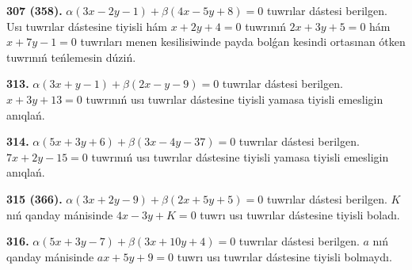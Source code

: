 \documentclass{article}
\begin{document}
\textbf{307 (358).} \(\alpha(3x-2y-1)+\beta(4x-5y+8)=0\) tuwrılar
dástesi berilgen. Usı tuwrılar dástesine tiyisli hám \(x+2y+4=0\)
tuwrınıń \(2x+3y+5=0\) hám \(x+7y-1=0\) tuwrıları menen
kesilisiwinde payda bolǵan kesindi ortasınan ótken tuwrınıń teńlemesin
dúziń.

\textbf{313.}
\(\alpha(3x+y-1)+\beta(2x-y-9)=0\) tuwrılar dástesi
berilgen. \(x+3y+13=0\) tuwrınıń usı tuwrılar dástesine tiyisli
yamasa tiyisli emesligin anıqlań.

\textbf{314.}
\(\alpha(5x+3y+6)+\beta(3x-4y-37)=0\) tuwrılar
dástesi berilgen. \(7x+2y-15=0\) tuwrınıń usı tuwrılar dástesine
tiyisli yamasa tiyisli emesligin anıqlań.

\textbf{315 (366).} \(\alpha(3x+2y-9)+\beta(2x+5y+5)=0\)
tuwrılar dástesi berilgen. $K$ nıń qanday mánisinde
\(4x-3y+K=0\) tuwrı usı tuwrılar dástesine tiyisli boladı.

\textbf{316.}
\(\alpha(5x+3y-7)+\beta(3x+10y+4)=0\) tuwrılar
dástesi berilgen. $a$ nıń qanday mánisinde \(ax+5y+9=0\)
tuwrı usı tuwrılar dástesine tiyisli bolmaydı.
\end{document}
